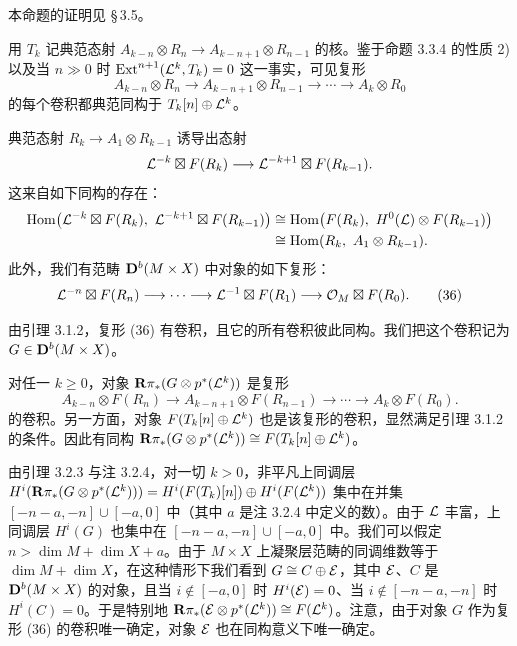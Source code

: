 本命题的证明见 \S\,3.5。

用 $T_{k}$ 记典范态射 $A_{k-n}\otimes R_{n}\to A_{k-n+1}\otimes R_{n-1}$ 的核。鉴于命题 3.3.4 的性质 2) 以及当 $n\gg0$ 时 $\operatorname{Ext}^{n+1}(\mathcal{L}^{k},T_{k})=0$ 这一事实，可见复形
\begin{equation*}
A_{k-n}\otimes R_{n}\longrightarrow A_{k-n+1}\otimes R_{n-1}\longrightarrow\cdots\longrightarrow A_{k}\otimes R_{0}
\end{equation*}
的每个卷积都典范同构于 $T_{k}[n]\oplus\mathcal{L}^{k}$。

典范态射 $R_{k}\to A_{1}\otimes R_{k-1}$ 诱导出态射
\begin{equation*}
\mathcal{L}^{-k}\boxtimes F(R_{k})\longrightarrow\mathcal{L}^{-k+1}\boxtimes F(R_{k-1}).
\end{equation*}
这来自如下同构的存在：
\begin{align*}
\operatorname{Hom}\bigl(\mathcal{L}^{-k}\boxtimes F(R_{k}),\ \mathcal{L}^{-k+1}\boxtimes F(R_{k-1})\bigr)&\cong\operatorname{Hom}\bigl(F(R_{k}),\ H^{0}(\mathcal{L})\otimes F(R_{k-1})\bigr)\\
&\cong\operatorname{Hom}(R_{k},\ A_{1}\otimes R_{k-1}).
\end{align*}
此外，我们有范畴 $\mathbf{D}^{b}(M\times X)$ 中对象的如下复形：
\begin{equation}
\mathcal{L}^{-n}\boxtimes F(R_{n})\longrightarrow\cdots\longrightarrow\mathcal{L}^{-1}\boxtimes F(R_{1})\longrightarrow\mathcal{O}_{M}\boxtimes F(R_{0}).
\tag{36}
\end{equation}

由引理 3.1.2，复形 (36) 有卷积，且它的所有卷积彼此同构。我们把这个卷积记为 $G\in\mathbf{D}^{b}(M\times X)$。

对任一 $k\geqslant0$，对象 $\mathbf{R}\pi_{*}(G\otimes p^{*}(\mathcal{L}^{k}))$ 是复形
\begin{equation}
A_{k-n}\otimes F(R_{n})\longrightarrow A_{k-n+1}\otimes F(R_{n-1})\longrightarrow\cdots\longrightarrow A_{k}\otimes F(R_{0}).
\tag{37}
\end{equation}
的卷积。另一方面，对象 $F(T_{k}[n]\oplus\mathcal{L}^{k})$ 也是该复形的卷积，显然满足引理 3.1.2 的条件。因此有同构 $\mathbf{R}\pi_{*}(G\otimes p^{*}(\mathcal{L}^{k}))\cong F(T_{k}[n]\oplus\mathcal{L}^{k})$。

由引理 3.2.3 与注 3.2.4，对一切 $k>0$，非平凡上同调层 $H^{i}(\mathbf{R}\pi_{*}(G\otimes p^{*}(\mathcal{L}^{k})))=H^{i}(F(T_{k})[n])\oplus H^{i}(F(\mathcal{L}^{k}))$ 集中在并集 $[-n-a,-n]\cup[-a,0]$ 中（其中 $a$ 是注 3.2.4 中定义的数）。由于 $\mathcal{L}$ 丰富，上同调层 $H^{i}(G)$ 也集中在 $[-n-a,-n]\cup[-a,0]$ 中。我们可以假定 $n>\dim M+\dim X+a$。由于 $M\times X$ 上凝聚层范畴的同调维数等于 $\dim M+\dim X$，在这种情形下我们看到 $G\cong C\oplus\mathcal{E}$，其中 $\mathcal{E}$、$C$ 是 $\mathbf{D}^{b}(M\times X)$ 的对象，且当 $i\notin[-a,0]$ 时 $H^{i}(\mathcal{E})=0$、当 $i\notin[-n-a,-n]$ 时 $H^{i}(C)=0$。于是特别地 $\mathbf{R}\pi_{*}(\mathcal{E}\otimes p^{*}(\mathcal{L}^{k}))\cong F(\mathcal{L}^{k})$。注意，由于对象 $G$ 作为复形 (36) 的卷积唯一确定，对象 $\mathcal{E}$ 也在同构意义下唯一确定。

